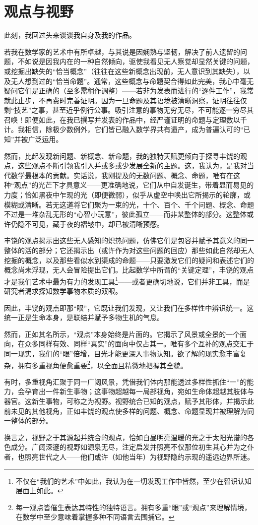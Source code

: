 \section{观点与视野}

此刻，我回过头来谈谈我自身及我的作品。

若我在数学家的艺术中有所卓越，与其说是因娴熟与坚韧，解决了前人遗留的问题，不如说是因我内在的一种自然倾向，驱使我看见无人察觉却显然关键的问题，或挖掘出缺失的“恰当概念”（往往在这些新概念出现前，无人意识到其缺失），以及无人想到过的“恰当命题”。通常，这些概念与命题契合得如此完美，我心中毫无疑问它们是正确的（至多需稍作调整）——若非为发表而进行的“逐件工作”，我常就此止步，不再费时完善证明。因为一旦命题及其语境被清晰洞察，证明往往仅剩“技艺”之事，甚至近乎例行公事。吸引注意的事物无穷无尽，不可能逐一穷尽其召唤！即便如此，在我已撰写并发表的作品中，经严谨证明的命题与定理数以千计。我相信，除极少数例外，它们皆已融入数学界共有遗产，成为普遍认可的“已知”并被广泛运用。

然而，比起发现新问题、新概念、新命题，我的独特天赋更倾向于探寻丰饶的观点，这些观点不断引领我引入并或多或少发展全新的主题。这，我认为，是我对当代数学最根本的贡献。实话说，我刚提及的无数问题、概念、命题，唯有在这种“观点”的光芒下才具意义——更准确地说，它们从中自发诞生，带着显而易见的力度；恰如黑夜中乍现的光（即便微弱），似乎从虚空中唤出它所揭示的轮廓，或模糊或清晰。若无这道将它们聚为一束的光，十个、百个、千个问题、概念、命题不过是一堆杂乱无形的“心智小玩意”，彼此孤立——而非某整体的部分。这整体或许仍隐不可见，藏于夜的褶皱中，却已被清晰预感。

丰饶的观点揭示出这些无人感知的炽热问题，仿佛它们是包容并赋予其意义的同一整体的活的部分；它还揭示出（或许作为对这些问题的回应）那些如此自然却无人挖掘的概念，以及那些看似水到渠成的命题——只要激发它们的疑问和表述它们的概念尚未浮现，无人会冒险提出它们。比起数学中所谓的“关键定理”，丰饶的观点才是我们艺术中最为有力的发现工具\footnote{不仅在“我们的艺术”中如此，我认为在一切发现工作中皆然，至少在智识认知层面上如此。}——或者更确切地说，它们并非工具，而是研究者渴求探知数学事物本质的双眼。

因此，丰饶的观点即那“眼”，它既让我们发现，又让我们在多样性中辨识统一。这统一正是生命本身，是联结并赋予多物生机的气息。

然而，正如其名所示，“观点”本身始终是片面的。它揭示了风景或全景的一个面向，在众多同样有效、同样“真实”的面向中仅占其一。唯有多个互补的观点交汇于同一现实，我们的“眼”倍增，目光才能更深入事物认知。欲了解的现实愈丰富复杂，拥有多重视角便愈重要\footnote{每一观点皆催生表达其特性的独特语言。拥有多重“眼”或“观点”来理解情境，在数学中至少意味着掌握多种不同语言去围捕它。}，以全面且精微地把握其全貌。

有时，多重视角汇聚于同一广阔风景，凭借我们体内那能透过多样性抓住“一”的能力，会孕育出一件新生事物；这事物超越每一局部视角，宛如生命体超越其肢体与器官。这新生事物，可称之为视野。视野统合已知的观点，赋予其形体，并揭示此前未见的其他视角，正如丰饶的观点使多样的问题、概念、命题显现并被理解为同一整体的部分。

换言之，视野之于其源起并统合的观点，恰如白昼明亮温暖的光之于太阳光谱的各色成分。广阔深邃的视野如源泉无尽，注定启发并照亮不仅那位初生其心并为之仆者，也照亮世代之人——他们或许（如他当年）为视野隐约示现的遥远边界所迷。
